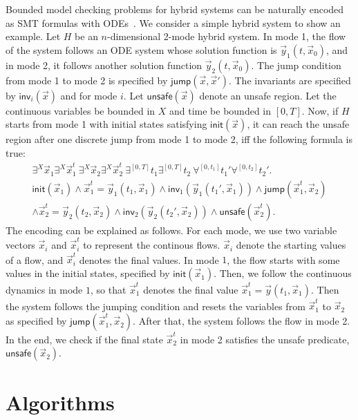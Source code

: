 \documentclass[12pt]{article}
\newcommand{\jump}{\mathsf{jump}}
\newcommand{\inv}{\mathsf{inv}}
\newcommand{\init}{\mathsf{init}}
\newcommand{\unsafe}{\mathsf{unsafe}}
\begin{document}
 Bounded model checking problems for hybrid systems can be naturally encoded as SMT formulas with ODEs~\cite{Eggers2008,Eggers2011,DBLP:journals/sttt/IshiiUH11,DBLP:conf/fmcad/CimattiMT12,DBLP:conf/aaai/CimattiMT12}. We consider a simple hybrid system to show an example. Let $H$ be an $n$-dimensional 2-mode hybrid system. In mode 1, the flow of the system follows an ODE system whose solution function is $\vec y_1(t, \vec x_0)$, and in mode 2, it follows another solution function $\vec y_2(t, \vec x_0)$. The jump condition from mode 1 to mode 2 is specified by $\jump(\vec x, \vec x')$. The invariants are specified by $\inv_i(\vec x)$ and for mode $i$. Let $\unsafe(\vec x)$ denote an unsafe region. Let the continuous variables be bounded in $X$ and time be bounded in $[0,T]$. Now, if $H$ starts from mode 1 with initial states satisfying $\init(\vec x)$, it can reach the unsafe region after one discrete jump from mode 1 to mode 2, iff the following formula is true:
{\small
\begin{multline*}
\exists^X \vec x_1 \exists^X \vec x_1^t\ \exists^X \vec x_2\exists^X \vec x_2^t\ \exists^{[0,T]}t_1\exists^{[0,T]}t_2\ \forall^{[0,t_1]}t_1'\forall^{[0,t_2]}t_2'.\\
\init(\vec x_1)\wedge\vec x_1^t = \vec y_1(t_1,\vec x_1)\wedge \inv_1(\vec y_1(t_1', \vec x_1))\wedge \jump(\vec x_1^t, \vec x_2)\\
\wedge \vec x_2^t = \vec y_2(t_2, \vec x_2)\wedge \inv_2(\vec y_2(t_2', \vec x_2))\wedge \unsafe(\vec x_2^t).
\end{multline*}
}The encoding can be explained as follows. For each mode, we use two variable vectors $\vec x_i$ and $\vec x_i^t$ to represent the continous flows. $\vec x_i$ denote the starting values of a flow, and $\vec x_i^t$ denotes the final values. In mode $1$, the flow starts with some values in the initial states, specified by $\init(\vec x_1)$. Then, we follow the continuous dynamics in mode $1$, so that $\vec x_1^t$ denotes the final value $\vec x_1^t = \vec y(t_1, \vec x_1)$. Then the system follows the jumping condition and resets the variables from $\vec x_1^t$ to $\vec x_2$ as specified by $\jump(\vec x_1^t, \vec x_2)$. After that, the system follows the flow in mode 2. In the end, we check if the final state $\vec x_2^t$ in mode 2 satisfies the unsafe predicate, $\unsafe(\vec x_2)$. 

\section{Algorithms}\label{algorithms}
\end{document}
